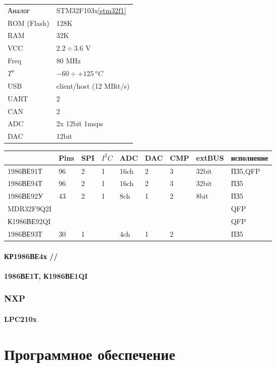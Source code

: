 \bigskip
\begin{tabular}{l l}
Аналог & STM32F103x\ref{stm32f1}\\
ROM (Flash) & 128K \\
RAM & 32K \\
VCC & $2.2\div3.6$ V\\
Freq & 80 MHz \\
$T^o$ & $-60\div+125\ ^{o}C$ \\
USB & client/host (12 MBit/s) \\
UART & 2\\
CAN & 2\\
ADC & 2x 12bit 1msps\\
DAC & 12bit\\
\end{tabular}

\bigskip

\begin{tabular}{l l l l l l l l l}
& Pins & SPI & $I^{2}C$ & ADC & DAC & CMP & extBUS &исполнение \\
\hline
1986ВЕ91Т &96 &2 &1 &16ch &2 &3 &32bit &ПЗ5,QFP\\
1986ВЕ94Т &96 &2 &1 &16ch &2 &3 &32bit &ПЗ5\\
1986ВЕ92У  &43 &2 &1 &8ch  &1 &2 &8bit &ПЗ5\\
MDR32F9Q2I &   &  &  &     &  &  &     &QFP\\
К1986ВЕ92QI &   &  &  &     &  &  &     &QFP\\
1986ВЕ93Т &30 &1 &  &4ch  &1 &2 & &ПЗ5\\
\end{tabular}

\subsection{КР1986ВЕ4х //}

\subsection{1986ВЕ1Т, К1986ВЕ1QI}



\section{NXP}
\subsection{LPC210x}

\part{Программное обеспечение}


